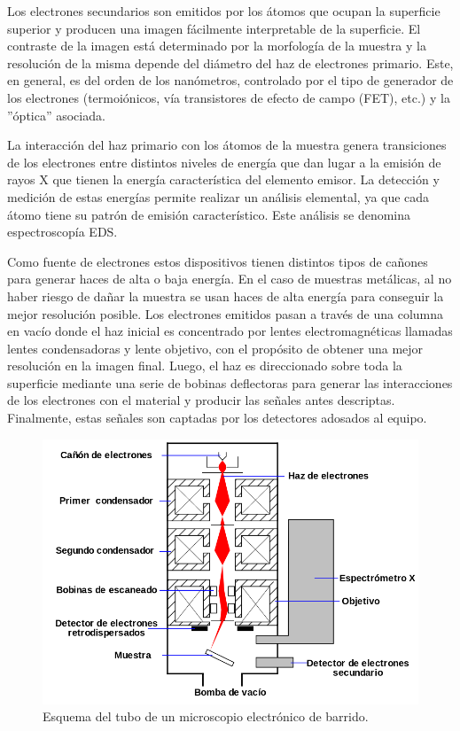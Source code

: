 \documentclass[12pt]{article}
\theoremstyle{definition}
\theoremstyle{remark}
\begin{document}
Los electrones secundarios son emitidos por los átomos que ocupan la superficie superior y producen una imagen fácilmente interpretable de la superficie. El contraste de la imagen está determinado por la morfología de la muestra y la resolución de la misma depende del diámetro del haz de electrones primario. Este, en general, es del orden de los nanómetros, controlado por el tipo de generador de los electrones (termoiónicos, vía transistores de efecto de campo (FET), etc.) y la ''óptica” asociada.

La interacción del haz primario con los átomos de la muestra genera transiciones de los electrones entre distintos niveles de energía que dan lugar a la emisión de rayos X que tienen la energía característica del elemento emisor. La detección y medición de estas energías permite realizar un análisis elemental, ya que cada átomo tiene su patrón de emisión característico. Este análisis se denomina espectroscopía EDS.

Como fuente de electrones estos dispositivos tienen distintos tipos de cañones para generar haces de alta o baja energía. En el caso de muestras metálicas, al no haber riesgo de dañar la muestra se usan haces de alta energía para conseguir la mejor resolución posible. Los electrones emitidos pasan a través de una columna en vacío donde el haz inicial es concentrado por lentes electromagnéticas llamadas lentes condensadoras y lente objetivo, con el propósito de obtener una mejor resolución en la imagen final. Luego, el haz es direccionado sobre toda la superficie mediante una serie de bobinas deflectoras para generar las interacciones de los electrones con el material y producir las señales antes descriptas. Finalmente, estas señales son captadas por los detectores adosados al equipo.

 \begin{figure}[H]
 	\centering
	\includegraphics[scale=0.5]{img/SEM.png}
 	\caption{Esquema del tubo de un microscopio electrónico de barrido.}
	\label{SEM}
\end{figure} 
\end{document}
